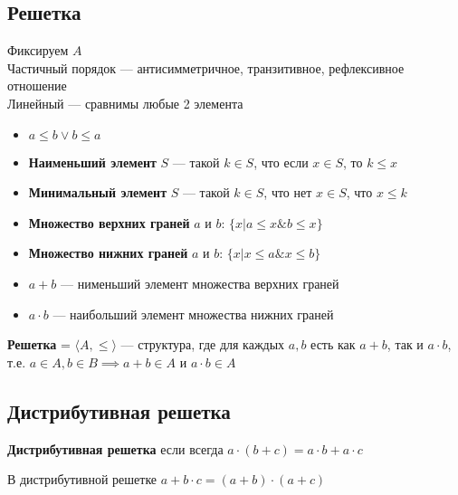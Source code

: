 \documentclass[english]{article}
\begin{document}
\subsection{Решетка}
\label{sec:orgd1f8726}
\begin{definition}
	Фиксируем \(A\) \\
	Частичный порядок --- антисимметричное, транзитивное, рефлексивное отношение \\
	Линейный --- сравнимы любые 2 элемента \\
	\begin{itemize}
		\item \(a \le b \vee b \le a\)
		\item \textbf{Наименьший элемент} \(S\) --- такой \(k \in S\), что если \(x \in S\), то \(k \le x\)
		\item \textbf{Минимальный элемент} \(S\) --- такой \(k \in S\), что нет \(x \in S\), что \(x \le k\)
	\end{itemize}
	\label{org823a1c9}
\end{definition}
\begin{definition}
	\-
	\begin{itemize}
		\item \textbf{Множество верхних граней} \(a\) и \(b\): \(\{x \big| a \le x \& b \le x\}\)
		\item \textbf{Множество нижних граней} \(a\) и \(b\): \(\{x \big| x \le a \& x \le b\}\)
	\end{itemize}
	\label{org92d8d5c}
\end{definition}
\begin{definition}
	\-
	\begin{itemize}
		\item \textbf{\(a + b\)} --- нименьший элемент множества верхних граней
		\item \textbf{\(a \cdot b\)} --- наибольший элемент множества нижних граней
	\end{itemize}
	\label{org806dc29}
\end{definition}
\begin{definition}
	\textbf{Решетка} = \(\langle A, \le \rangle\) --- структура, где для каждых \(a, b\) есть как \(a + b\), так и \(a \cdot b\), \\
	т.е. \(a \in A, b \in B \implies a + b \in A\) и \(a \cdot b \in A\)
	\label{org2f07bad}
\end{definition}
\subsection{Дистрибутивная решетка}
\label{sec:orgeac75a4}
\begin{definition}
	\textbf{Дистрибутивная решетка} если всегда  \(a \cdot (b + c) = a \cdot b + a \cdot c\)
	\label{org97cdb86}
\end{definition}
\begin{lemma}
	В дистрибутивной решетке \(a + b\cdot c = (a + b) \cdot(a + c)\)
	\label{org35529c3}
\end{lemma}
\end{document}
